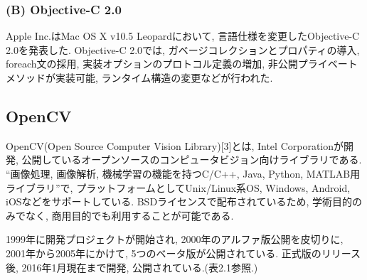\subsubsection{(B) Objective-C 2.0}
Apple Inc.はMac OS X v10.5 Leopardにおいて, 言語仕様を変更したObjective-C 2.0を発表した.
Objective-C 2.0では, ガベージコレクションとプロパティの導入, foreach文の採用, 実装オプションのプロトコル定義の増加, 非公開プライベートメソッドが実装可能, ランタイム構造の変更などが行われた.

\subsection{OpenCV}
OpenCV(Open Source Computer Vision Library)[3]とは, Intel Corporationが開発, 公開しているオープンソースのコンピュータビジョン向けライブラリである.
“画像処理, 画像解析, 機械学習の機能を持つC/C++, Java, Python, MATLAB用ライブラリ”で, プラットフォームとしてUnix/Linux系OS, Windows, Android, iOSなどをサポートしている.
BSDライセンスで配布されているため, 学術目的のみでなく, 商用目的でも利用することが可能である.

1999年に開発プロジェクトが開始され, 2000年のアルファ版公開を皮切りに, 2001年から2005年にかけて, 5つのベータ版が公開されている.
正式版のリリース後, 2016年1月現在まで開発, 公開されている.(表2.1参照.)

